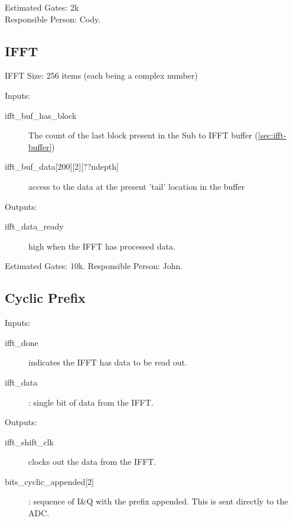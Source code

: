 \documentclass[10pt,twocolumn]{article}
\begin{document}
		Estimated Gates: 2k \\
		Responsible Person: Cody.

	\subsection{IFFT}
	\label{sec:ifft}
	IFFT Size: 256 items (each being a complex number)
	\begin{description}
		\item{Inputs:}
		\begin{description}
			\item[ifft\_buf\_has\_block] The count of the last
				block present in the Sub to IFFT buffer
				(\autoref{sec:ifft-buffer})
			
			\item[ifft\_buf\_data{[200][2][??ndepth]}] access
				to the data at the present 'tail' location
				in the buffer
		\end{description}
		
		\item{Outputs:}
		\begin{description}
			\item[ifft\_data\_ready] high when the IFFT has
				processed data.
		\end{description}
	\end{description}

	Estimated Gates: 10k.
	Responsible Person: John.

	\subsection{Cyclic Prefix}
	\label{sec:cyclic_prefix}
	\begin{description}
		\item{Inputs:}
		\begin{description}
			\item[ifft\_done] indicates the IFFT has
				data to be read out.
			\item[ifft\_data] : single bit of data from
				the IFFT.
		\end{description}
		\item{Outputs:}
		\begin{description}
			\item[ifft\_shift\_clk] clocks out the data from the IFFT.
			\item[bits\_cyclic\_appended{[2]}]: sequence of
				I\&Q with the prefix appended.
				This is sent directly to the ADC.
		\end{description}
	\end{description}
\end{document}
